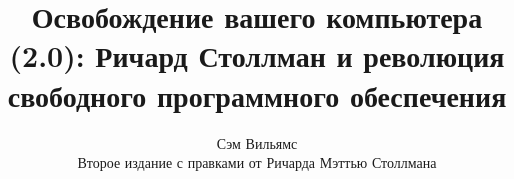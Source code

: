 \documentclass[10pt]{book}
\begin{document}
\title{Освобождение вашего компьютера (2.0): Ричард Столлман и революция свободного программного обеспечения}
\author{Сэм Вильямс \\ Второе издание с правками от Ричарда Мэттью Столлмана}
\date{}

\maketitle
\thispagestyle{empty}
\frontmatter

\thispagestyle{empty}
\tableofcontents



\mainmatter














\backmatter



\printindex
\end{document}
